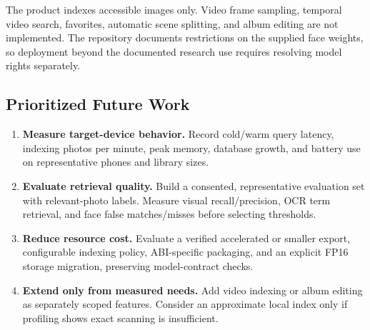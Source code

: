 \documentclass[11pt,a4paper]{article}
\begin{document}
The product indexes accessible images only. Video frame sampling, temporal video search, favorites, automatic scene splitting, and album editing are not implemented. The repository documents restrictions on the supplied face weights, so deployment beyond the documented research use requires resolving model rights separately.

\subsection{Prioritized Future Work}
\begin{enumerate}
\item \textbf{Measure target-device behavior.} Record cold/warm query latency, indexing photos per minute, peak memory, database growth, and battery use on representative phones and library sizes.
\item \textbf{Evaluate retrieval quality.} Build a consented, representative evaluation set with relevant-photo labels. Measure visual recall/precision, OCR term retrieval, and face false matches/misses before selecting thresholds.
\item \textbf{Reduce resource cost.} Evaluate a verified accelerated or smaller export, configurable indexing policy, ABI-specific packaging, and an explicit FP16 storage migration, preserving model-contract checks.
\item \textbf{Extend only from measured needs.} Add video indexing or album editing as separately scoped features. Consider an approximate local index only if profiling shows exact scanning is insufficient.
\end{enumerate}
\end{document}
